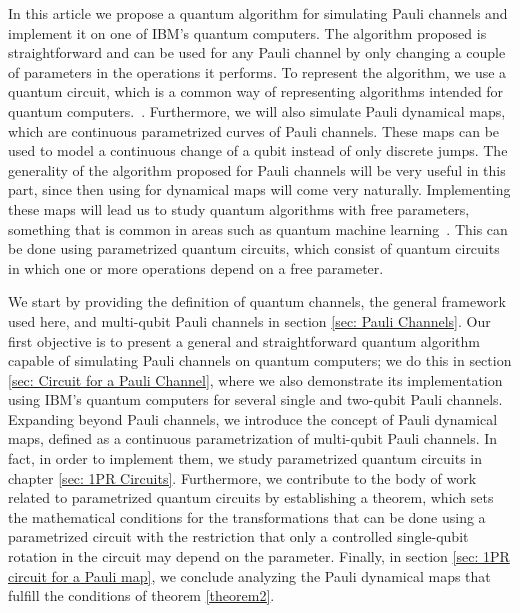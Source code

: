 \documentclass[10pt,letterpaper]{article} %
\begin{document}
In this article we propose a quantum algorithm for simulating Pauli channels
and implement it on one of IBM's quantum computers.  The algorithm proposed is
straightforward and can be used for any Pauli channel by only changing a couple
of parameters in the operations it performs.  To represent the algorithm, we
use a quantum circuit, which is a common way of representing algorithms
intended for quantum computers.~\cite{chuangbook}.  Furthermore, we will also
simulate Pauli dynamical maps, which are continuous parametrized curves of
Pauli channels.  These maps can be used to model a continuous change of a qubit
instead of only discrete jumps.  The generality of the algorithm proposed for
Pauli channels will be very useful in this part, since then using for dynamical
maps will come very naturally.  Implementing these maps will lead us to study
quantum algorithms  with free parameters, something that is common in areas
such as quantum machine learning~\cite{Benedetti}.  This can be done using
parametrized quantum circuits, which consist of quantum circuits in which one
or more operations depend on a free parameter. 


We start by providing the definition of quantum channels, the general framework
used here, and multi-qubit Pauli channels in section \ref{sec: Pauli Channels}.
Our first objective is to present a general and straightforward quantum algorithm capable of simulating
Pauli channels on quantum computers; we do this in section \ref{sec: Circuit
for a Pauli Channel}, where we also demonstrate its implementation using IBM's
quantum computers for several single and two-qubit Pauli channels.
Expanding beyond Pauli channels, we introduce the concept of Pauli
dynamical maps, defined as a continuous parametrization of multi-qubit Pauli
channels. In fact, in order  to implement them, we study parametrized quantum
circuits in chapter \ref{sec: 1PR Circuits}. Furthermore, we contribute to the body of work
related to parametrized quantum circuits by establishing a theorem, which  sets
the mathematical conditions for the transformations that can be done using a
parametrized circuit with the restriction that only a controlled single-qubit
rotation in the circuit may depend on the parameter.  Finally, in section
\ref{sec: 1PR circuit for a Pauli map}, we conclude analyzing the Pauli
dynamical maps that fulfill the conditions of theorem \ref{theorem2}. 
\end{document}
